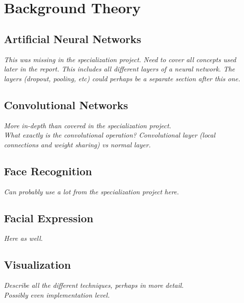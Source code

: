 
\chapter{Background Theory}

\section{Artificial Neural Networks}

\textit{This was missing in the specialization project. Need to cover all concepts used later in the report. This includes all different layers of a neural network. The layers (dropout, pooling, etc) could perhaps be a separate section after this one.}

\section{Convolutional Networks}

\textit{More in-depth than covered in the specialization project. \\
What exactly is the convolutional operation? Convolutional layer (local connections and weight sharing) vs normal layer.}

\section{Face Recognition}

\textit{Can probably use a lot from the specialization project here.}

\section{Facial Expression}

\textit{Here as well.}

\section{Visualization}

\textit{Describe all the different techniques, perhaps in more detail. \\
Possibly even implementation level.}

\cleardoublepage